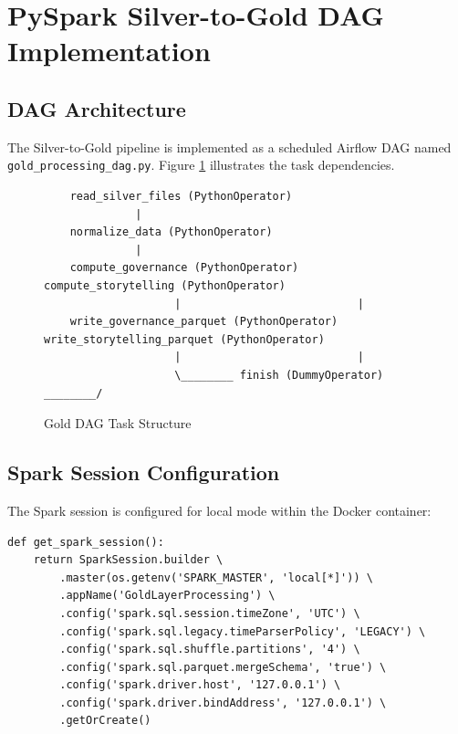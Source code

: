 \documentclass[12pt]{article}
\begin{document}
\newpage

\section{PySpark Silver-to-Gold DAG Implementation}
\label{sec:pyspark_implementation}

\subsection{DAG Architecture}

The Silver-to-Gold pipeline is implemented as a scheduled Airflow DAG named \texttt{gold\_processing\_dag.py}. Figure \ref{fig:dag_structure} illustrates the task dependencies.

\begin{figure}[H]
\centering
\caption{Gold DAG Task Structure}
\label{fig:dag_structure}
\begin{verbatim}
    read_silver_files (PythonOperator)
              |
    normalize_data (PythonOperator)
              |
    compute_governance (PythonOperator)  compute_storytelling (PythonOperator)
                    |                           |
    write_governance_parquet (PythonOperator)  write_storytelling_parquet (PythonOperator)
                    |                           |
                    \________ finish (DummyOperator) ________/
\end{verbatim}
\end{figure}

\subsection{Spark Session Configuration}

The Spark session is configured for local mode within the Docker container:

\begin{lstlisting}[caption=Spark Session Configuration]
def get_spark_session():
    return SparkSession.builder \
        .master(os.getenv('SPARK_MASTER', 'local[*]')) \
        .appName('GoldLayerProcessing') \
        .config('spark.sql.session.timeZone', 'UTC') \
        .config('spark.sql.legacy.timeParserPolicy', 'LEGACY') \
        .config('spark.sql.shuffle.partitions', '4') \
        .config('spark.sql.parquet.mergeSchema', 'true') \
        .config('spark.driver.host', '127.0.0.1') \
        .config('spark.driver.bindAddress', '127.0.0.1') \
        .getOrCreate()
\end{lstlisting}
\end{document}
